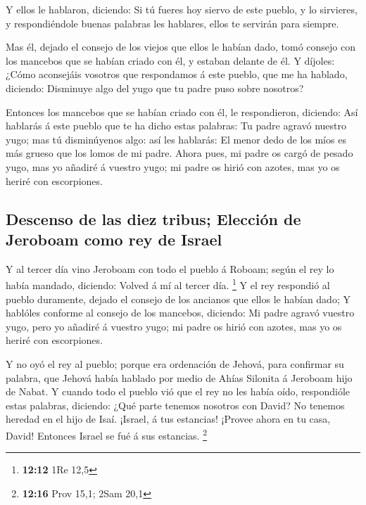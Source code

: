  Y ellos le hablaron, diciendo: Si tú fueres hoy siervo de
este pueblo, y lo sirvieres, y respondiéndole buenas palabras les
hablares, ellos te servirán para siempre.

 Mas él, dejado el consejo de los viejos que ellos le habían
dado, tomó consejo con los mancebos que se habían criado con él, y
estaban delante de él.  Y díjoles: ¿Cómo aconsejáis vosotros
que respondamos á este pueblo, que me ha hablado, diciendo: Disminuye
algo del yugo que tu padre puso sobre nosotros?

 Entonces los mancebos que se habían criado con él, le
respondieron, diciendo: Así hablarás á este pueblo que te ha dicho estas
palabras: Tu padre agravó nuestro yugo; mas tú disminúyenos algo: así
les hablarás: El menor dedo de los míos es más grueso que los lomos de
mi padre.  Ahora pues, mi padre os cargó de pesado yugo,
mas yo añadiré á vuestro yugo; mi padre os hirió con azotes, mas yo os
heriré con escorpiones.

\hypertarget{descenso-de-las-diez-tribus-elecciuxf3n-de-jeroboam-como-rey-de-israel}{%
\subsection{Descenso de las diez tribus; Elección de Jeroboam como rey
de
Israel}\label{descenso-de-las-diez-tribus-elecciuxf3n-de-jeroboam-como-rey-de-israel}}

 Y al tercer día vino Jeroboam con todo el pueblo á Roboam;
según el rey lo había mandado, diciendo: Volved á mí al tercer día.
\footnote{\textbf{12:12} 1Re 12,5}  Y el rey respondió al
pueblo duramente, dejado el consejo de los ancianos que ellos le habían
dado;  Y hablóles conforme al consejo de los mancebos,
diciendo: Mi padre agravó vuestro yugo, pero yo añadiré á vuestro yugo;
mi padre os hirió con azotes, mas yo os heriré con escorpiones.

 Y no oyó el rey al pueblo; porque era ordenación de
Jehová, para confirmar su palabra, que Jehová había hablado por medio de
Ahías Silonita á Jeroboam hijo de Nabat.  Y cuando todo el
pueblo vió que el rey no les había oído, respondióle estas palabras,
diciendo: ¿Qué parte tenemos nosotros con David? No tenemos heredad en
el hijo de Isaí. ¡Israel, á tus estancias! ¡Provee ahora en tu casa,
David! Entonces Israel se fué á sus estancias. \footnote{\textbf{12:16}
  Prov 15,1; 2Sam 20,1}

